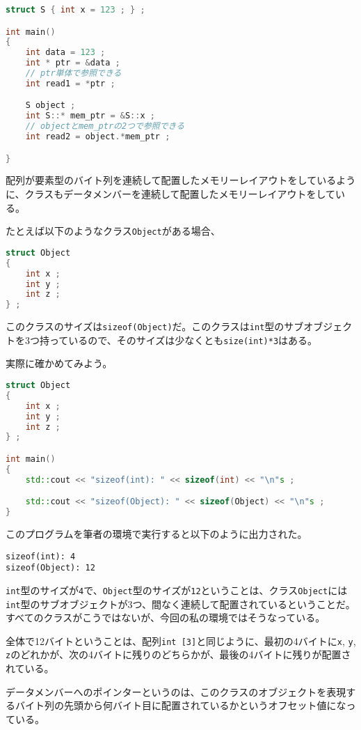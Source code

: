 \begin{lstlisting}[language={C++}]
struct S { int x = 123 ; } ;

int main()
{
    int data = 123 ;
    int * ptr = &data ;
    // ptr単体で参照できる
    int read1 = *ptr ;

    S object ;
    int S::* mem_ptr = &S::x ;
    // objectとmem_ptrの2つで参照できる
    int read2 = object.*mem_ptr ;

}
\end{lstlisting}

配列が要素型のバイト列を連続して配置したメモリーレイアウトをしているように、クラスもデータメンバーを連続して配置したメモリーレイアウトをしている。

たとえば以下のようなクラス\texttt{Object}がある場合、
\begin{lstlisting}[language={C++}]
struct Object
{
    int x ;
    int y ;
    int z ;
} ;
\end{lstlisting}
このクラスのサイズは\texttt{sizeof(Object)}だ。このクラスは\texttt{int}型のサブオブジェクトを3つ持っているので、そのサイズは少なくとも\texttt{size(int)*3}はある。

実際に確かめてみよう。

\begin{lstlisting}[language={C++}]
struct Object
{
    int x ;
    int y ;
    int z ;
} ;

int main()
{
    std::cout << "sizeof(int): " << sizeof(int) << "\n"s ;

    std::cout << "sizeof(Object): " << sizeof(Object) << "\n"s ;
}
\end{lstlisting}

このプログラムを筆者の環境で実行すると以下のように出力された。

\begin{lstlisting}[style=terminal]
sizeof(int): 4
sizeof(Object): 12
\end{lstlisting}

\texttt{int}型のサイズが\texttt{4}で、\texttt{Object}型のサイズが\texttt{12}ということは、クラス\texttt{Object}には\texttt{int}型のサブオブジェクトが3つ、間なく連続して配置されているということだ。すべてのクラスがこうではないが、今回の私の環境ではそうなっている。

全体で12バイトということは、配列\texttt{int [3]}と同じように、最初の4バイトに\texttt{x}, \texttt{y}, \texttt{z}のどれかが、次の4バイトに残りのどちらかが、最後の4バイトに残りが配置されている。

データメンバーへのポインターというのは、このクラスのオブジェクトを表現するバイト列の先頭から何バイト目に配置されているかというオフセット値になっている。

